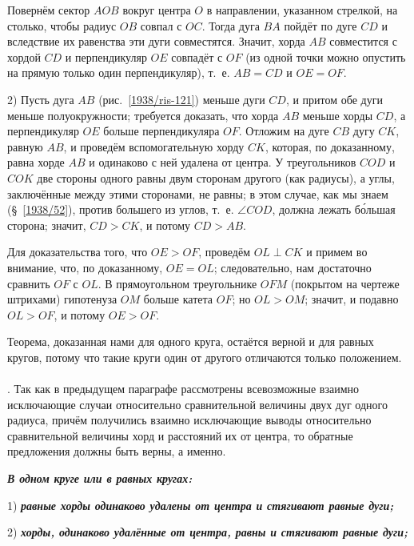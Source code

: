 \documentclass[oneside]{book}
\begin{document}
Повернём сектор $AOB$ вокруг центра $O$ в направлении, указанном стрелкой, на столько, чтобы радиус $OB$ совпал с $OC$.
Тогда дуга $BA$ пойдёт по дуге $CD$ и вследствие их равенства эти дуги совместятся.
Значит, хорда $AB$ совместится с хордой $CD$ и перпендикуляр $OE$ совпадёт с $OF$ (из одной точки можно опустить на прямую только один перпендикуляр), т.~е.
$AB=CD$ и $OE=OF$.


2) Пусть дуга $AB$ (рис.~\ref{1938/ris-121}) меньше дуги $CD$, и притом обе дуги меньше полуокружности;
требуется доказать, что хорда $AB$ меньше хорды $CD$, а перпендикуляр $OE$ больше перпендикуляра $OF$.
Отложим на дуге $CB$ дугу $CK$, равную $AB$, и проведём вспомогательную хорду $CK$, которая, по доказанному, равна хорде $AB$ и одинаково с ней удалена от центра.
У треугольников $COD$ и $COK$ две стороны одного равны двум сторонам другого (как радиусы), а углы, заключённые между этими сторонами, не равны;
в этом случае, как мы знаем (§~\ref{1938/52}), против большего из углов, т.~е.
$\angle COD$, должна лежать б\'{о}льшая сторона;
значит, $CD>CK$, и потому $CD>AB$.

Для доказательства того, что $OE>OF$, проведём $OL\perp CK$ и примем во внимание, что, по доказанному, $OE=OL$;
следовательно, нам достаточно сравнить $OF$ с $OL$.
В прямоугольном треугольнике $OFM$ (покрытом на чертеже штрихами) гипотенуза $OM$ больше катета $OF$;
но $OL>OM$;
значит, и подавно $OL>OF$, и потому $OE>OF$.

Теорема, доказанная нами для одного круга, остаётся верной и для равных кругов, потому что такие круги один от другого отличаются только положением.

\paragraph{}\label{1938/110}
.
Так как в предыдущем параграфе рассмотрены всевозможные взаимно исключающие случаи относительно сравнительной величины двух дуг одного радиуса, причём получились взаимно исключающие выводы относительно сравнительной величины хорд и расстояний их от центра, то обратные предложения должны быть верны, а именно.

\textbf{\emph{В одном круге или в равных кругах:}}

1) \textbf{\emph{равные хорды одинаково удалены от центра и стягивают равные дуги;}}

2) \textbf{\emph{хорды, одинаково удалённые от центра, равны и стягивают равные дуги;}}
\end{document}

